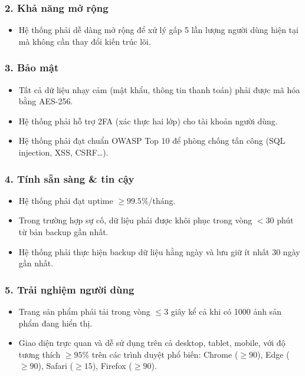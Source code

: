 \documentclass{article}
\begin{document}
\subsubsection*{2. Khả năng mở rộng}
\begin{itemize}
    \item Hệ thống phải dễ dàng mở rộng để xử lý gấp 5 lần lượng người dùng hiện tại mà không cần thay đổi kiến trúc lõi.
\end{itemize}

\subsubsection*{3. Bảo mật}
\begin{itemize}
    \item Tất cả dữ liệu nhạy cảm (mật khẩu, thông tin thanh toán) phải được mã hóa bằng AES-256.
    \item Hệ thống phải hỗ trợ 2FA (xác thực hai lớp) cho tài khoản người dùng.
    \item Hệ thống phải đạt chuẩn OWASP Top 10 để phòng chống tấn công (SQL injection, XSS, CSRF…).
\end{itemize}

\subsubsection*{4. Tính sẵn sàng \& tin cậy}
\begin{itemize}
    \item Hệ thống phải đạt uptime $\geq 99.5\%$/tháng.
    \item Trong trường hợp sự cố, dữ liệu phải được khôi phục trong vòng $< 30$ phút từ bản backup gần nhất.
    \item Hệ thống phải thực hiện backup dữ liệu hằng ngày và lưu giữ ít nhất 30 ngày gần nhất.
\end{itemize}

\subsubsection*{5. Trải nghiệm người dùng}
\begin{itemize}
    \item Trang sản phẩm phải tải trong vòng $\leq 3$ giây kể cả khi có 1000 ảnh sản phẩm đang hiển thị.
    \item Giao diện trực quan và dễ sử dụng trên cả desktop, tablet, mobile, với độ tương thích $\geq 95\%$ trên các trình duyệt phổ biến: Chrome ($\geq 90$), Edge ($\geq 90$), Safari ($\geq 15$), Firefox ($\geq 90$).
\end{itemize}
\end{document}
